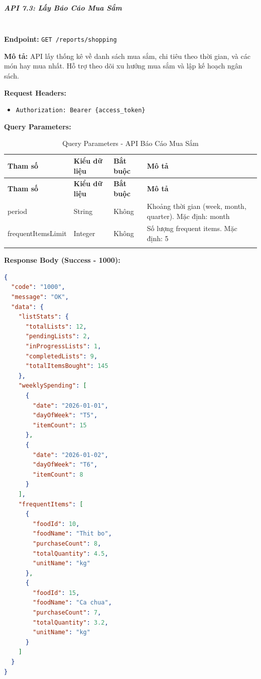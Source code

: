 \normalsize

\subparagraph{API 7.3: Lấy Báo Cáo Mua Sắm}~\\

\textbf{Endpoint:} \texttt{GET /reports/shopping}

\textbf{Mô tả:} API lấy thống kê về danh sách mua sắm, chi tiêu theo thời gian, và các món hay mua nhất. Hỗ trợ theo dõi xu hướng mua sắm và lập kế hoạch ngân sách.

\textbf{Request Headers:}
\begin{itemize}
    \item \texttt{Authorization: Bearer \{access\_token\}}
\end{itemize}

\textbf{Query Parameters:}

\small
\begin{longtable}{|>{\raggedright\arraybackslash}p{3.5cm}|>{\raggedright\arraybackslash}p{2.5cm}|>{\raggedright\arraybackslash}p{2cm}|>{\raggedright\arraybackslash}p{5.5cm}|}
\hline
\textbf{Tham số} & \textbf{Kiểu dữ liệu} & \textbf{Bắt buộc} & \textbf{Mô tả} \\
\hline
\endfirsthead
\hline
\textbf{Tham số} & \textbf{Kiểu dữ liệu} & \textbf{Bắt buộc} & \textbf{Mô tả} \\
\hline
\endhead
period & String & Không & Khoảng thời gian (week, month, quarter). Mặc định: month \\
\hline
frequentItemsLimit & Integer & Không & Số lượng frequent items. Mặc định: 5 \\
\hline
\caption{Query Parameters - API Báo Cáo Mua Sắm}
\end{longtable}

\textbf{Response Body (Success - 1000):}

\begin{lstlisting}[language=json, caption=Response thanh cong API 7.3]
{
  "code": "1000",
  "message": "OK",
  "data": {
    "listStats": {
      "totalLists": 12,
      "pendingLists": 2,
      "inProgressLists": 1,
      "completedLists": 9,
      "totalItemsBought": 145
    },
    "weeklySpending": [
      {
        "date": "2026-01-01",
        "dayOfWeek": "T5",
        "itemCount": 15
      },
      {
        "date": "2026-01-02",
        "dayOfWeek": "T6",
        "itemCount": 8
      }
    ],
    "frequentItems": [
      {
        "foodId": 10,
        "foodName": "Thit bo",
        "purchaseCount": 8,
        "totalQuantity": 4.5,
        "unitName": "kg"
      },
      {
        "foodId": 15,
        "foodName": "Ca chua",
        "purchaseCount": 7,
        "totalQuantity": 3.2,
        "unitName": "kg"
      }
    ]
  }
}
\end{lstlisting}

